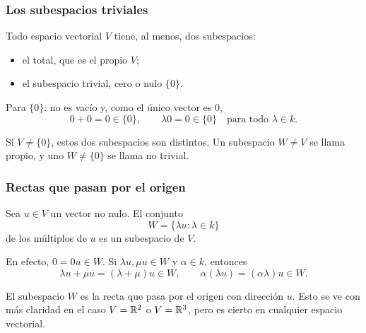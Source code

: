 \begin{frame}
    \frametitle{Los subespacios triviales}

    \begin{example}
        Todo espacio vectorial $V$ tiene, al menos, dos subespacios:
        \begin{itemize}
            \item el \alert{total}, que es el propio $V$;
            \item el \alert{subespacio trivial}, \alert{cero} o \alert{nulo} $\{0\}$.
        \end{itemize}
    \end{example}

    \medskip

    Para $\{0\}$: no es vacío y, como el único vector es $0$,
    \[
        0+0=0\in\{0\},
        \qquad
        \lambda 0=0\in\{0\}
        \quad\text{para todo }\lambda\in k.
    \]

    \medskip

    Si $V\neq\{0\}$, estos dos subespacios son distintos.
    Un subespacio $W\neq V$ se llama \alert{propio}, y uno $W\neq\{0\}$
    se llama \alert{no trivial}.
\end{frame}

\begin{frame}
    \frametitle{Rectas que pasan por el origen}

    \begin{example}
        Sea $u\in V$ un vector no nulo. El conjunto
        \[
            W=\{\lambda u:\lambda\in k\}
        \]
        de los múltiplos de $u$ es un subespacio de $V$.
    \end{example}

    \medskip

    En efecto, $0=0u\in W$. Si $\lambda u,\mu u\in W$ y $\alpha\in k$, entonces
    \[
        \lambda u+\mu u=(\lambda+\mu)u\in W,
        \qquad
        \alpha(\lambda u)=(\alpha\lambda)u\in W.
    \]

    \medskip

    El subespacio $W$ es la \alert{recta} que pasa por el origen
    con dirección $u$. Esto se ve con más claridad en el caso $V=\mathbb{R}^2$ o $V=\mathbb{R}^3$, pero es cierto en cualquier espacio vectorial.
\end{frame}

